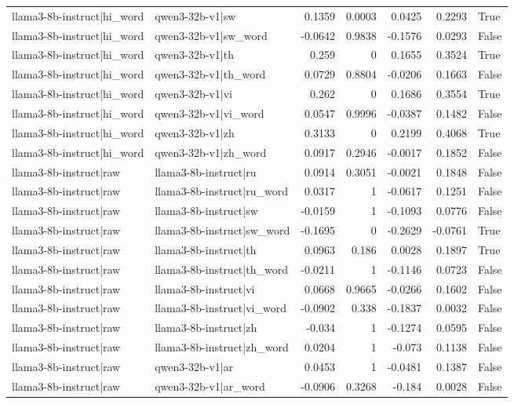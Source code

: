 \begin{table}
\begin{tabular}{l l r r r r l}
llama3-8b-instruct|hi_word & qwen3-32b-v1|sw & 0.1359 & 0.0003 & 0.0425 & 0.2293 & True \\
llama3-8b-instruct|hi_word & qwen3-32b-v1|sw_word & -0.0642 & 0.9838 & -0.1576 & 0.0293 & False \\
llama3-8b-instruct|hi_word & qwen3-32b-v1|th & 0.259 & 0 & 0.1655 & 0.3524 & True \\
llama3-8b-instruct|hi_word & qwen3-32b-v1|th_word & 0.0729 & 0.8804 & -0.0206 & 0.1663 & False \\
llama3-8b-instruct|hi_word & qwen3-32b-v1|vi & 0.262 & 0 & 0.1686 & 0.3554 & True \\
llama3-8b-instruct|hi_word & qwen3-32b-v1|vi_word & 0.0547 & 0.9996 & -0.0387 & 0.1482 & False \\
llama3-8b-instruct|hi_word & qwen3-32b-v1|zh & 0.3133 & 0 & 0.2199 & 0.4068 & True \\
llama3-8b-instruct|hi_word & qwen3-32b-v1|zh_word & 0.0917 & 0.2946 & -0.0017 & 0.1852 & False \\
llama3-8b-instruct|raw & llama3-8b-instruct|ru & 0.0914 & 0.3051 & -0.0021 & 0.1848 & False \\
llama3-8b-instruct|raw & llama3-8b-instruct|ru_word & 0.0317 & 1 & -0.0617 & 0.1251 & False \\
llama3-8b-instruct|raw & llama3-8b-instruct|sw & -0.0159 & 1 & -0.1093 & 0.0776 & False \\
llama3-8b-instruct|raw & llama3-8b-instruct|sw_word & -0.1695 & 0 & -0.2629 & -0.0761 & True \\
llama3-8b-instruct|raw & llama3-8b-instruct|th & 0.0963 & 0.186 & 0.0028 & 0.1897 & True \\
llama3-8b-instruct|raw & llama3-8b-instruct|th_word & -0.0211 & 1 & -0.1146 & 0.0723 & False \\
llama3-8b-instruct|raw & llama3-8b-instruct|vi & 0.0668 & 0.9665 & -0.0266 & 0.1602 & False \\
llama3-8b-instruct|raw & llama3-8b-instruct|vi_word & -0.0902 & 0.338 & -0.1837 & 0.0032 & False \\
llama3-8b-instruct|raw & llama3-8b-instruct|zh & -0.034 & 1 & -0.1274 & 0.0595 & False \\
llama3-8b-instruct|raw & llama3-8b-instruct|zh_word & 0.0204 & 1 & -0.073 & 0.1138 & False \\
llama3-8b-instruct|raw & qwen3-32b-v1|ar & 0.0453 & 1 & -0.0481 & 0.1387 & False \\
llama3-8b-instruct|raw & qwen3-32b-v1|ar_word & -0.0906 & 0.3268 & -0.184 & 0.0028 & False \\

\end{tabular}
\end{table}
